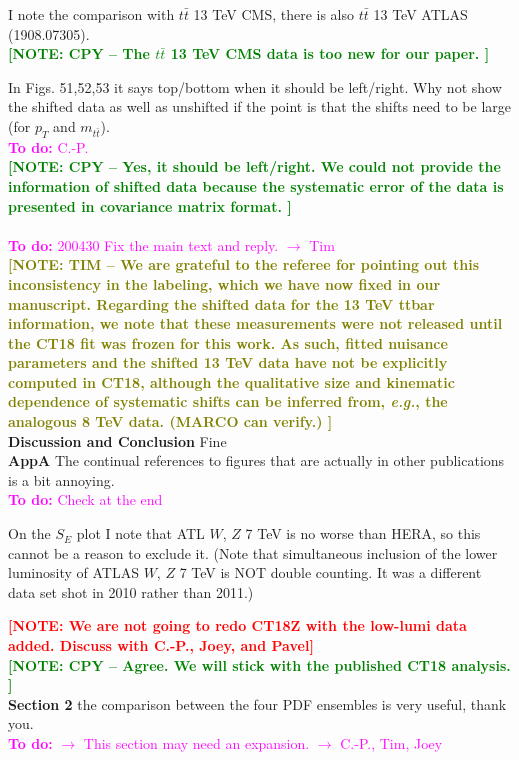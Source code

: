\documentclass[aps,prd,amsmath,nofootinbib,floatfix,fleqn]{revtex4}
\newcommand{\TODO}[1]{\textcolor{magenta}{
\quad\vspace{3pt} \\ {\bf To do:} #1 \\
}}
\newcommand{\NOTE}[1]{\textcolor{red}{ \bf[NOTE: #1]}}
\newcommand{\NOTECPY}[1]{\textcolor{green}{ \bf[NOTE: CPY -- #1 ]}}
\newcommand{\NOTETIM}[1]{\textcolor{olive}{ \bf[NOTE: TIM -- #1 ]}}
\begin{document}
\noindent

I note the comparison with $t\bar t$ 13 TeV CMS, there is also $t\bar t$ 13 TeV ATLAS (1908.07305). \\ 
\NOTECPY{The $t\bar t$ 13 TeV CMS data is too new for our paper.}\\

\noindent

In Figs. 51,52,53 it says top/bottom when it should be left/right. Why not show the shifted data as well as unshifted if the point is that the shifts need to be large (for $p_T$ and $m_{t\bar t}$).  
\TODO{C.-P.}
\NOTECPY{Yes, it should be left/right. We could not provide the information of shifted data because the systematic error of the data is presented in covariance matrix format. }\\
\TODO{200430 Fix the main text and reply. $\to$ Tim}
\NOTETIM{We are grateful to the referee for pointing out this inconsistency in the labeling,
which we have now fixed in our manuscript.  Regarding the shifted data for the 13 TeV ttbar
information, we note that these measurements were not released until the CT18 fit was frozen
for this work.  As such, fitted nuisance parameters and the shifted 13 TeV data have not be
explicitly computed in CT18, although the qualitative size and kinematic dependence of
systematic shifts can be inferred from, {\it e.g.}, the analogous 8 TeV data. ({\bf MARCO
can verify.})}\\

{\bf Discussion and Conclusion}
Fine\\


{\bf AppA}
The continual references to figures that are actually in other publications is a bit annoying.  
\TODO{Check at the end}


\noindent
On the $S_E$ plot I note that ATL $W$, $Z$ 7 TeV is no worse than HERA, so this cannot be a reason to exclude it. (Note that simultaneous inclusion of the lower luminosity of ATLAS $W$, $Z$ 7 TeV is NOT double counting. It was a different data set shot in 2010 rather than 2011.) 

\NOTE{We are not going to redo CT18Z with the low-lumi data added. Discuss with C.-P., Joey, and Pavel}\\
\NOTECPY{Agree. We will stick with the published CT18 analysis.}\\


\noindent
{\bf Section 2} the comparison between the four PDF ensembles is very useful, thank you.  
\TODO{$\to$ This section may need an expansion. $\to$ C.-P., Tim, Joey}
\end{document}
